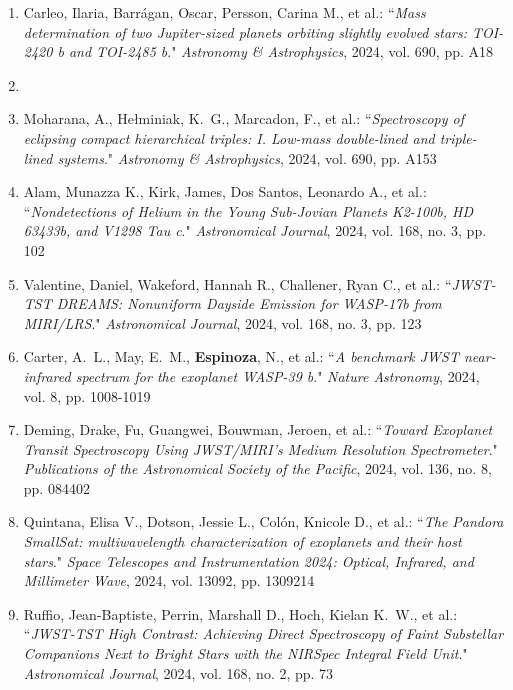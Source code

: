 \documentclass[12pt, a4paper]{article} %
\begin{document}
\begin{flushleft}
\begin{enumerate}
\item Carleo, Ilaria, Barrágan, Oscar, Persson, Carina M., et al.: ``\textit{Mass determination of two Jupiter-sized planets orbiting slightly evolved stars: TOI-2420 b and TOI-2485 b}." \textit{Astronomy \& Astrophysics}, 2024, vol. 690, pp. A18
\item  {}
\item Moharana, A., Hełminiak, K.~G., Marcadon, F., et al.: ``\textit{Spectroscopy of eclipsing compact hierarchical triples: I. Low-mass double-lined and triple-lined systems}." \textit{Astronomy \& Astrophysics}, 2024, vol. 690, pp. A153
\item Alam, Munazza K., Kirk, James, Dos Santos, Leonardo A., et al.: ``\textit{Nondetections of Helium in the Young Sub-Jovian Planets K2-100b, HD 63433b, and V1298 Tau c}." \textit{Astronomical Journal}, 2024, vol. 168, no. 3, pp. 102
\item Valentine, Daniel, Wakeford, Hannah R., Challener, Ryan C., et al.: ``\textit{JWST-TST DREAMS: Nonuniform Dayside Emission for WASP-17b from MIRI/LRS}." \textit{Astronomical Journal}, 2024, vol. 168, no. 3, pp. 123
\item Carter, A.~L., May, E.~M., \textbf{Espinoza}, N., et al.: ``\textit{A benchmark JWST near-infrared spectrum for the exoplanet WASP-39 b}." \textit{Nature Astronomy}, 2024, vol. 8, pp. 1008-1019
\item Deming, Drake, Fu, Guangwei, Bouwman, Jeroen, et al.: ``\textit{Toward Exoplanet Transit Spectroscopy Using JWST/MIRI's Medium Resolution Spectrometer}." \textit{Publications of the Astronomical Society of the Pacific}, 2024, vol. 136, no. 8, pp. 084402
\item Quintana, Elisa V., Dotson, Jessie L., Colón, Knicole D., et al.: ``\textit{The Pandora SmallSat: multiwavelength characterization of exoplanets and their host stars}." \textit{Space Telescopes and Instrumentation 2024: Optical, Infrared, and Millimeter Wave}, 2024, vol. 13092, pp. 1309214
\item Ruffio, Jean-Baptiste, Perrin, Marshall D., Hoch, Kielan K.~W., et al.: ``\textit{JWST-TST High Contrast: Achieving Direct Spectroscopy of Faint Substellar Companions Next to Bright Stars with the NIRSpec Integral Field Unit}." \textit{Astronomical Journal}, 2024, vol. 168, no. 2, pp. 73

\end{enumerate}
\end{flushleft}
\end{document}
